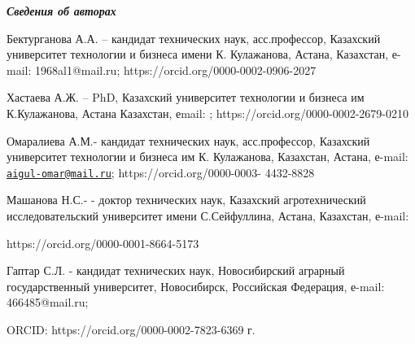 \begin{authorinfo}
\emph{{\bfseries Сведения об авторах}}

Бектурганова А.А. -- кандидат технических наук, асс.профессор, Казахский
университет технологии и бизнеса имени К. Кулажанова, Астана, Казахстан,
е-mail: 1968al1@mail.ru; https://orcid.org/0000-0002-0906-2027

Хастаева А.Ж. -- PhD, Казахский университет технологии и бизнеса им
К.Кулажанова, Астана Казахстан, еmail:
\href{mailto:gera_or@mail.ru}{};
https://orcid.org/0000-0002-2679-0210

Омаралиева А.М.- кандидат технических наук, асс.профессор, Казахский
университет технологии и бизнеса им К. Кулажанова, Казахстан, Астана,
е-mail:
\href{mailto:aigul-omar@mail.ru}{\nolinkurl{aigul-omar@mail.ru}};
https://orcid.org/0000-0003- 4432-8828

Машанова Н.С.- - доктор технических наук, Казахский агротехнический
исследовательский университет имени С.Сейфуллина, Астана, Казахстан,
е-mail:

https://orcid.org/0000-0001-8664-5173

Гаптар С.Л. - кандидат технических наук, Новосибирский аграрный
государственный университет, Новосибирск, Российская Федерация, е-mail:
466485@mail.ru;

ORCID: https://orcid.org/0000-0002-7823-6369 г.\
\end{authorinfo}
